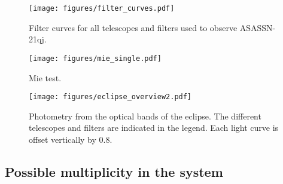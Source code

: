 \documentclass{aa}
\begin{document}
\begin{figure}
   \begin{centering}
   \texttt{[image: figures/filter\_curves.pdf]}
      \caption{Filter curves for all telescopes and filters used to observe ASASSN-21qj.}
      \label{fig:allfilters}
      \end{centering}
\end{figure}



\begin{figure}
   \begin{centering}
   \texttt{[image: figures/mie\_single.pdf]}
      \caption{Mie test.}
      \label{fig:mietest}
      \end{centering}
\end{figure}




\begin{figure*}
   \begin{centering}
   \texttt{[image: figures/eclipse\_overview2.pdf]}
      \caption{Photometry from the optical bands of the eclipse.
The different telescopes and filters are indicated in the legend.
%
Each light curve is offset vertically by 0.8.
              }
        \label{fig:eclipse_overview}
    \end{centering}
\end{figure*}



\subsection{Possible multiplicity in the  system}
\end{document}
